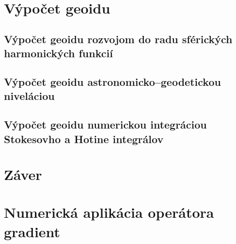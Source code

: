 \documentclass[a4paper, 12pt]{book}
\begin{document}

\chapter{Výpočet geoidu}







\section{Výpočet geoidu rozvojom do radu sférických harmonických funkcií}







\section{Výpočet geoidu astronomicko--geodetickou niveláciou}







\section{Výpočet geoidu numerickou integráciou Stokesovho a Hotine integrálov}







\chapter*{Záver}







\appendix
\chapter{Numerická aplikácia operátora gradient}
\label{app:numerical_application_of_gradient}
\end{document}
